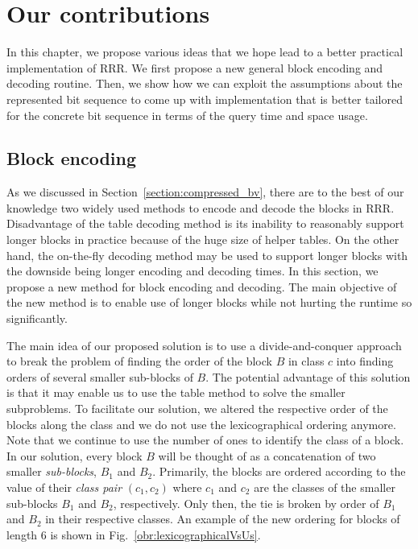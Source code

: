 \chapter{Our contributions}
\label{kap:kap3}


In this chapter, we propose various ideas that we hope lead to a better practical
implementation of RRR. We first propose a new general block encoding and decoding routine.
Then, we show how we can exploit the assumptions about the represented bit sequence to
come up with implementation that is better tailored for the concrete bit sequence in terms of
the query time and space usage.

\section{Block encoding}

As we discussed in Section~\ref{section:compressed_bv}, there are to
the best of our knowledge two widely used methods to encode and decode the
blocks in RRR. Disadvantage of the table decoding method is its inability
to reasonably support longer blocks in practice because of the huge size of
helper tables. On the other hand, the on-the-fly decoding method may be used
to support longer blocks with the downside being longer encoding and decoding
times. In this section, we propose a new method for block encoding and decoding.
The main objective of the new method is to enable use of longer blocks while not
hurting the runtime so significantly.

The main idea of our proposed solution is to use a divide-and-conquer approach to
break the problem of finding the order of the block $B$ in class $c$ into finding
orders of several smaller sub-blocks of $B$. The potential advantage of this
solution is that it may enable us to use the table method to solve the smaller
subproblems. To facilitate our solution, we altered the respective order of the blocks
along the class and we do not use the lexicographical ordering anymore. Note that we
continue to use the number of ones to identify the class of a block. In our solution, every
block $B$ will be thought of as a concatenation of two smaller \textit{sub-blocks}, $B_1$
and $B_2$. Primarily, the blocks are ordered according to the value of their \textit{class pair}
$(c_1, c_2)$ where $c_1$ and $c_2$ are the classes of the smaller sub-blocks $B_1$ and $B_2$,
respectively. Only then, the tie is broken by order of $B_1$ and $B_2$ in their respective
classes. An example of the new ordering for blocks of length 6 is shown in Fig.~\ref{obr:lexicographicalVsUs}.


